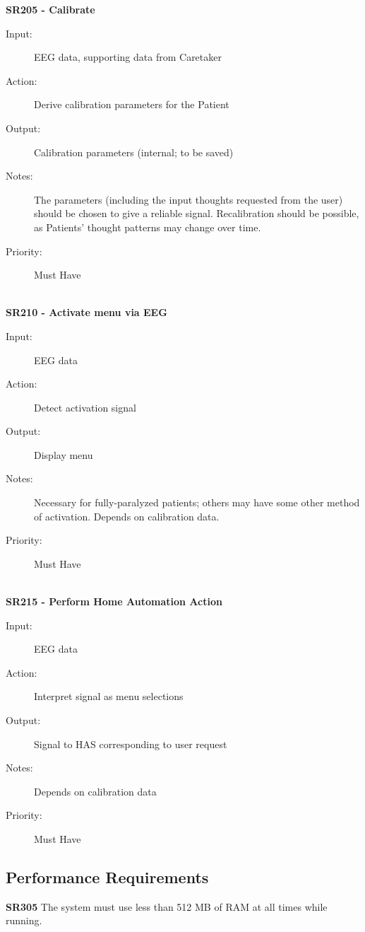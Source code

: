 \documentclass{article}
\begin{document}
\textbf{SR205 - Calibrate}
\begin{description}
    \item[Input:] EEG data, supporting data from Caretaker
    \item[Action:] Derive calibration parameters for the Patient
    \item[Output:] Calibration parameters (internal; to be saved)
    \item[Notes:] The parameters (including the input thoughts requested from
        the user) should be chosen to give a reliable signal. Recalibration
        should be possible, as Patients' thought patterns may change over
        time.
    \item[Priority:] Must Have
\end{description}

\hfill \\

\textbf{SR210 - Activate menu via EEG}
\begin{description}
    \item[Input:] EEG data
    \item[Action:] Detect activation signal
    \item[Output:] Display menu
    \item[Notes:] Necessary for fully-paralyzed patients; others may have some
        other method of activation. Depends on calibration data.
    \item[Priority:] Must Have
\end{description}

\hfill \\

\textbf{SR215 - Perform Home Automation Action}
\begin{description}
    \item[Input:] EEG data
    \item[Action:] Interpret signal as menu selections
    \item[Output:] Signal to HAS corresponding to user request
    \item[Notes:] Depends on calibration data
    \item[Priority:] Must Have
\end{description}
\subsection{Performance Requirements}

\textbf{SR305} The system must use less than 512 MB of RAM at all times while running.
\end{document}
